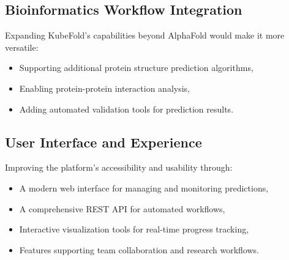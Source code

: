 \subsection{Bioinformatics Workflow Integration}
Expanding KubeFold's capabilities beyond AlphaFold would make it more versatile:
\begin{itemize}
    \item Supporting additional protein structure prediction algorithms,
    \item Enabling protein-protein interaction analysis,
    \item Adding automated validation tools for prediction results.
\end{itemize}

\subsection{User Interface and Experience}
Improving the platform's accessibility and usability through:
\begin{itemize}
    \item A modern web interface for managing and monitoring predictions,
    \item A comprehensive REST API for automated workflows,
    \item Interactive visualization tools for real-time progress tracking,
    \item Features supporting team collaboration and research workflows.
\end{itemize}
%
%
%
%
